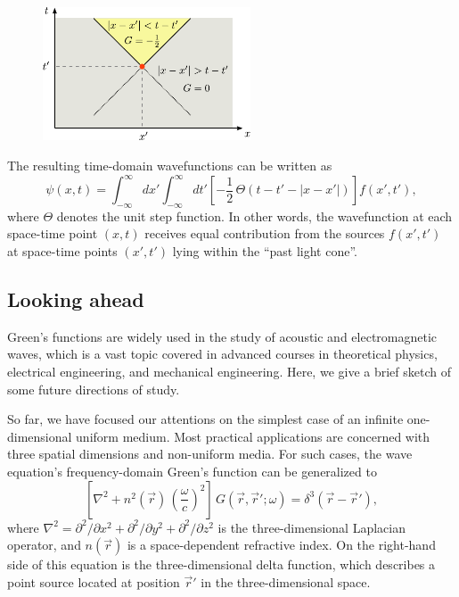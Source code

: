 \documentclass[10pt,a4paper]{article}
\begin{document}
\begin{figure}[ht]
  \centering\includegraphics[width=0.55\textwidth]{spacetime_diagram}
\end{figure}

The resulting time-domain wavefunctions can be written as
\begin{equation}
\psi(x,t) = \int_{-\infty}^\infty dx' \int_{-\infty}^\infty dt' \left[-\frac{1}{2}\,\Theta(t-t' - |x-x'|)\right] f(x',t'),
\end{equation}
where $\Theta$ denotes the unit step function. In other words, the
wavefunction at each space-time point $(x,t)$ receives equal
contribution from the sources $f(x',t')$ at space-time points
$(x',t')$ lying within the ``past light cone''.

\subsection{Looking ahead}\label{looking-ahead}

Green's functions are widely used in the study of acoustic and
electromagnetic waves, which is a vast topic covered in advanced
courses in theoretical physics, electrical engineering, and mechanical
engineering. Here, we give a brief sketch of some future directions of
study.

So far, we have focused our attentions on the simplest case of an
infinite one-dimensional uniform medium. Most practical applications
are concerned with three spatial dimensions and non-uniform media. For
such cases, the wave equation's frequency-domain Green's function can
be generalized to
\begin{equation}
\left[\nabla^2 + n^2(\vec{r}) \, \left(\frac{\omega}{c}\right)^2\right]\, G(\vec{r},\vec{r}';\omega) = \delta^3(\vec{r}-\vec{r}'),
\end{equation}
where $\nabla^2 = \partial^2/\partial x^2 + \partial^2/\partial y^2 +
\partial^2/\partial z^2$ is the three-dimensional Laplacian operator,
and $n(\vec{r})$ is a space-dependent refractive index. On the
right-hand side of this equation is the three-dimensional delta
function, which describes a point source located at position
$\vec{r}'$ in the three-dimensional space.
\end{document}
